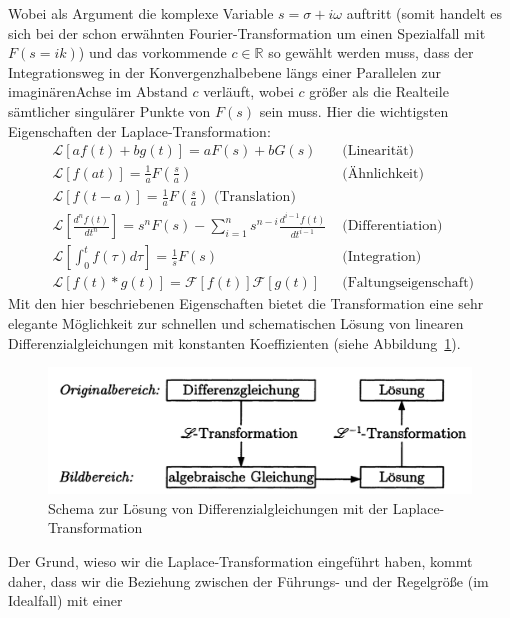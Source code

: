 Wobei als Argument die komplexe Variable $s=\sigma + i\omega$ auftritt (somit handelt es sich
bei der schon erwähnten Fourier-Transformation um einen Spezialfall mit $F(s = ik)$) und
das vorkommende $c\in \mathbb{R}$ so gewählt werden muss, dass der Integrationsweg in der 
Konvergenzhalbebene längs einer Parallelen zur imaginärenAchse im Abstand $c$ verläuft, wobei
$c$ größer als die Realteile sämtlicher singulärer Punkte von $F(s)$ sein muss.
Hier die wichtigsten Eigenschaften der Laplace-Transformation:
\begin{align}
&\mathcal{L}\left [a f(t) + b g(t)\right ]
   = a F(s) + b G(s) 
    &\mbox{ (Linearität) }\\
&\mathcal{L}\left [f(at)\right ]
    = \frac{1}{a}F(\frac{s}{a}) 
    &\mbox{ (Ähnlichkeit) }\\
&\mathcal{L}\left [f(t-a)\right ]
    = \frac{1}{a}F(\frac{s}{a}) 
    \mbox{ (Translation) }\\
&\mathcal{L}\left [\frac{d^nf(t)}{dt^n}\right ]
    = s^nF(s) - \sum_{i=1}^{n}s^{n-i}\frac{d^{i-1}f(t)}{dt^{i-1}} 
    &\mbox{ (Differentiation) }\\
&\mathcal{L}\left [\int_{0}^{t}f(\tau)d\tau\right ]
    = \frac{1}{s}F(s)
   &\mbox{ (Integration) }\\
&\mathcal{L}\left [f(t) * g(t)\right ]
    = \mathcal{F}\left [f(t)\right ]\mathcal{F}\left [g(t)\right ]
     &\mbox{ (Faltungseigenschaft) }
\end{align}
Mit den hier beschriebenen Eigenschaften bietet die Transformation eine sehr
elegante Möglichkeit zur schnellen und schematischen Lösung von linearen Differenzialgleichungen
mit konstanten Koeffizienten (siehe Abbildung~\ref{fig:laplace1}).
\begin{figure}[h]
\includegraphics[width=14cm]{pics/laplace1}
\caption{Schema zur Lösung von Differenzialgleichungen mit der Laplace-Transformation 
\cite{regelungstechnik2}} 
\label{fig:laplace1}
\end{figure}
Der Grund, wieso wir die Laplace-Transformation eingeführt haben, kommt daher, dass wir
die Beziehung zwischen der Führungs- und der Regelgröße (im Idealfall) mit einer
